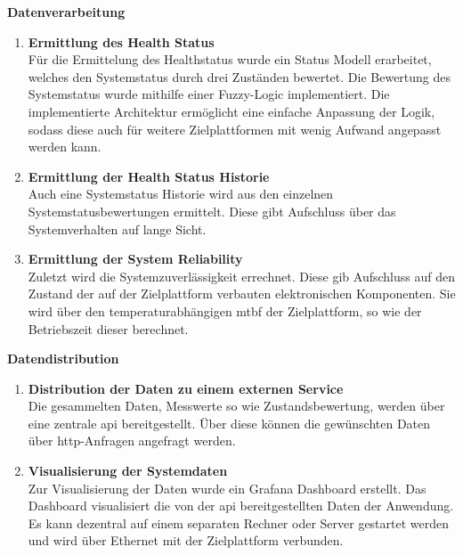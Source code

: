 \textbf{Datenverarbeitung}
\begin{enumerate}
    \item \textbf{Ermittlung des Health Status}\\
    Für die Ermittelung des Healthstatus wurde ein Status Modell erarbeitet, welches den Systemstatus durch drei Zuständen bewertet. Die Bewertung des Systemstatus wurde mithilfe einer Fuzzy-Logic implementiert. Die implementierte Architektur ermöglicht eine einfache Anpassung der Logik, sodass diese auch für weitere Zielplattformen mit wenig Aufwand angepasst werden kann.  
    \item \textbf{Ermittlung der Health Status Historie}\\
    Auch eine Systemstatus Historie wird aus den einzelnen Systemstatusbewertungen ermittelt. Diese gibt Aufschluss über das Systemverhalten auf lange Sicht.  
    \item \textbf{Ermittlung der System Reliability}\\
    Zuletzt wird die Systemzuverlässigkeit errechnet. Diese gib Aufschluss auf den Zustand der auf der Zielplattform verbauten elektronischen Komponenten. Sie wird über den temperaturabhängigen \ac{mtbf} der Zielplattform, so wie der Betriebszeit dieser berechnet. 
\end{enumerate}

\textbf{Datendistribution}
\begin{enumerate}
    \item \textbf{Distribution der Daten zu einem externen Service}\\
    Die gesammelten Daten, Messwerte so wie Zustandsbewertung, werden über eine zentrale \ac{api} bereitgestellt. Über diese können die gewünschten Daten über \ac{http}-Anfragen angefragt werden.   
    \item \textbf{Visualisierung der Systemdaten}\\
    Zur Visualisierung der Daten wurde ein Grafana Dashboard erstellt. Das Dashboard visualisiert die von der \ac{api} bereitgestellten Daten der Anwendung. Es kann dezentral auf einem separaten Rechner oder Server gestartet werden und wird über Ethernet mit der Zielplattform verbunden. 
\end{enumerate}